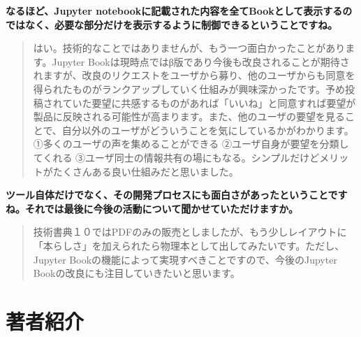 \documentclass[dvipdfmx,autodetect-engine,10pt,b5paper,papersize,openany,dvipsnames]{jsbook}
\begin{document}
\begin{multicols}{2}
\noindent
\textbf{なるほど、Jupyter notebookに記載された内容を全てBookとして表示するのではなく、必要な部分だけを表示するように制御できるということですね。}

\begin{quotation}
  \noindent
はい。技術的なことではありませんが、もう一つ面白かったことがあります。Jupyter Bookは現時点ではβ版であり今後も改良されることが期待されますが、改良のリクエストをユーザから募り、他のユーザからも同意を得られたものがランクアップしていく仕組みが興味深かったです。予め投稿されていた要望に共感するものがあれば「いいね」と同意すれば要望が製品に反映される可能性が高まります。また、他のユーザの要望を見ることで、自分以外のユーザがどういうことを気にしているかがわかります。①多くのユーザの声を集めることができる ②ユーザ自身が要望を分類してくれる ③ユーザ同士の情報共有の場にもなる。シンプルだけどメリットがたくさんある良い仕組みだと思いました。
\end{quotation}



\noindent
\textbf{ツール自体だけでなく、その開発プロセスにも面白さがあったということですね。それでは最後に今後の活動について聞かせていただけますか。}


\begin{quotation}
  \noindent
技術書典１０ではPDFのみの販売としましたが、もう少しレイアウトに「本らしさ」を加えられたら物理本として出してみたいです。ただし、Jupyter Bookの機能によって実現すべきことですので、今後のJupyter Bookの改良にも注目していきたいと思います。
\end{quotation}

\end{multicols}

\newpage

\chapter*{著者紹介}
\end{document}
